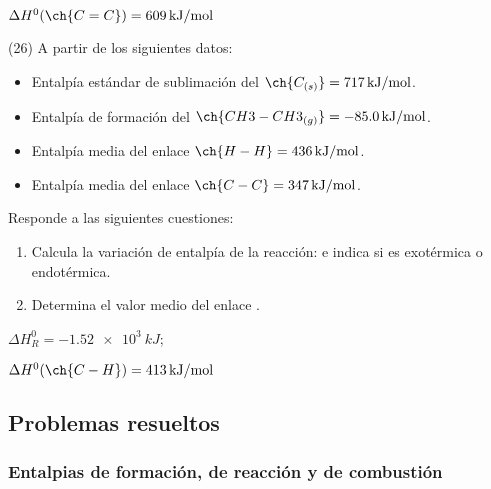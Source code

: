 \documentclass[10pt]{article}
\begin{document}
\begin{multicols}{2}
\begin{solution}
  \( \Delta H^0 (\ch{C=C}) = \SI{609}{kJ/mol} \)
\end{solution}





\begin{exercise}[
    tags    = {},
    topics  = {química, termodinámica, termoquímica},
    source  = {FQ 1B MGH 2016, p168, e26},
  ]
  (26) A partir de los siguientes datos:
  \begin{itemize}
    \item Entalpía estándar de sublimación del \( \ch{C_{(s)}} = \SI{717}{kJ/mol} \).
    \item Entalpía de formación del \( \ch{CH3-CH3_{(g)}} = \SI{-85,0}{kJ/mol} \).
    \item Entalpía media del enlace \( \ch{H-H} = \SI{436}{kJ/mol} \).
    \item Entalpía media del enlace \( \ch{C-C} = \SI{347}{kJ/mol} \).
  \end{itemize}
  Responde a las siguientes cuestiones: %
  \begin{enumerate}
    \item Calcula la variación de entalpía de la reacción:
     e indica si es exotérmica
    o endotérmica.
    \item Determina el valor medio del enlace .
  \end{enumerate}
\end{exercise}

\begin{solution}
  \begin{enumerate*}
    \item \( \Delta H^0_R = \SI{-1.52e3}{kJ} \); \item \( \Delta H^0 (\ch{C-H}) = \SI{413}{kJ/mol} \)
  \end{enumerate*}
\end{solution}






\subsection{Problemas resueltos}

\subsubsection{Entalpias de formación, de reacción y de combustión}


\end{multicols}
\end{document}
